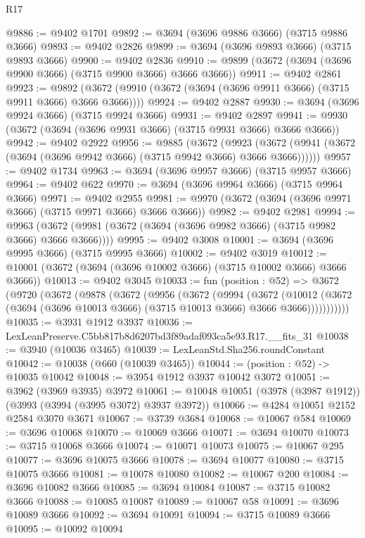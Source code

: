 \begin{lexlean}{R17}
\begin{coremodule}
@9886 := @9402 @1701
@9892 := @3694 (@3696 @9886 @3666) (@3715 @9886 @3666)
@9893 := @9402 @2826
@9899 := @3694 (@3696 @9893 @3666) (@3715 @9893 @3666)
@9900 := @9402 @2836
@9910 := @9899 (@3672 (@3694 (@3696 @9900 @3666) (@3715 @9900 @3666) @3666 @3666))
@9911 := @9402 @2861
@9923 := @9892 (@3672 (@9910 (@3672 (@3694 (@3696 @9911 @3666) (@3715 @9911 @3666) @3666 @3666))))
@9924 := @9402 @2887
@9930 := @3694 (@3696 @9924 @3666) (@3715 @9924 @3666)
@9931 := @9402 @2897
@9941 := @9930 (@3672 (@3694 (@3696 @9931 @3666) (@3715 @9931 @3666) @3666 @3666))
@9942 := @9402 @2922
@9956 := @9885
    (@3672
      (@9923 (@3672 (@9941 (@3672 (@3694 (@3696 @9942 @3666) (@3715 @9942 @3666) @3666 @3666))))))
@9957 := @9402 @1734
@9963 := @3694 (@3696 @9957 @3666) (@3715 @9957 @3666)
@9964 := @9402 @622
@9970 := @3694 (@3696 @9964 @3666) (@3715 @9964 @3666)
@9971 := @9402 @2955
@9981 := @9970 (@3672 (@3694 (@3696 @9971 @3666) (@3715 @9971 @3666) @3666 @3666))
@9982 := @9402 @2981
@9994 := @9963 (@3672 (@9981 (@3672 (@3694 (@3696 @9982 @3666) (@3715 @9982 @3666) @3666 @3666))))
@9995 := @9402 @3008
@10001 := @3694 (@3696 @9995 @3666) (@3715 @9995 @3666)
@10002 := @9402 @3019
@10012 := @10001 (@3672 (@3694 (@3696 @10002 @3666) (@3715 @10002 @3666) @3666 @3666))
@10013 := @9402 @3045
@10033 := fun (position : @52) =>
  @3672
    (@9720
      (@3672
        (@9878
          (@3672
            (@9956
              (@3672
                (@9994
                  (@3672
                    (@10012
                      (@3672 (@3694 (@3696 @10013 @3666) (@3715 @10013 @3666) @3666 @3666)))))))))))
@10035 := @3931 @1912 @3937
@10036 := LexLeanPreserve.C5bb817b8d6207bd3f89adaf093ca5e93.R17.__fits_31
@10038 := @3940 (@10036 @3465)
@10039 := LexLeanStd.Sha256.roundConstant
@10042 := @10038 (@660 (@10039 @3465))
@10044 := (position : @52) -> @10035 @10042
@10048 := @3954 @1912 @3937 @10042 @3072
@10051 := @3962 (@3969 @3935) @3972
@10061 := @10048 @10051 (@3978 (@3987 @1912)) (@3993 (@3994 (@3995 @3072) @3937 @3972))
@10066 := @4284 @10051 @2152 @2584 @3070 @3671
@10067 := @3739 @3684
@10068 := @10067 @584
@10069 := @3696 @10068
@10070 := @10069 @3666
@10071 := @3694 @10070
@10073 := @3715 @10068 @3666
@10074 := @10071 @10073
@10075 := @10067 @295
@10077 := @3696 @10075 @3666
@10078 := @3694 @10077
@10080 := @3715 @10075 @3666
@10081 := @10078 @10080
@10082 := @10067 @200
@10084 := @3696 @10082 @3666
@10085 := @3694 @10084
@10087 := @3715 @10082 @3666
@10088 := @10085 @10087
@10089 := @10067 @58
@10091 := @3696 @10089 @3666
@10092 := @3694 @10091
@10094 := @3715 @10089 @3666
@10095 := @10092 @10094

\end{coremodule}
\end{lexlean}
